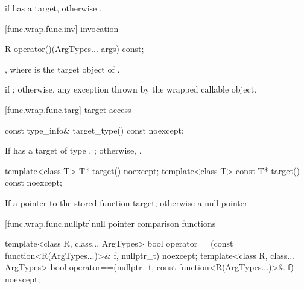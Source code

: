 \begin{itemdescr}
\pnum
\returns {} if  has a target, otherwise .
\end{itemdescr}

[func.wrap.func.inv]{ invocation}

%
%
\begin{itemdecl}
R operator()(ArgTypes... args) const;
\end{itemdecl}

\begin{itemdescr}
\pnum
\returns {},
where  is the target object of .

\pnum\throws
{} if ; otherwise, any
exception thrown by the wrapped callable object.
\end{itemdescr}

[func.wrap.func.targ]{ target access}

%
\begin{itemdecl}
const type_info& target_type() const noexcept;
\end{itemdecl}

\begin{itemdescr}
\pnum\returns If  has a target of type ,
  ; otherwise, .
\end{itemdescr}

%
\begin{itemdecl}
template<class T>       T* target() noexcept;
template<class T> const T* target() const noexcept;
\end{itemdecl}

\begin{itemdescr}
\pnum\returns If 
a pointer to the stored function target; otherwise a null pointer.
\end{itemdescr}

[func.wrap.func.nullptr]{null pointer comparison functions}

%
\begin{itemdecl}
template<class R, class... ArgTypes>
  bool operator==(const function<R(ArgTypes...)>& f, nullptr_t) noexcept;
template<class R, class... ArgTypes>
  bool operator==(nullptr_t, const function<R(ArgTypes...)>& f) noexcept;
\end{itemdecl}

